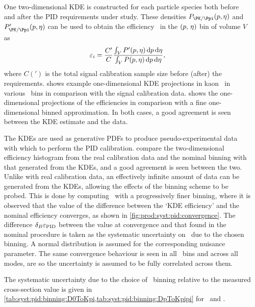 One two-dimensional \ac{KDE} is constructed for each particle species both 
before and after the \ac{PID} requirements under study.
These densities $P_{\PK/\Ppi}(\ptot, \Eta)$ and $P'_{\PK/\Ppi}(\ptot, \Eta)$
can be used to obtain the efficiency \effi\ in the $(p,\,\eta)$ bin of 
volume $V$ as
\begin{equation}
  \effi = \frac{C'}{C}\frac{%
    \int_{V} P'(\ptot,\Eta)\dif{p}\dif{\Eta}
  }{%
    \int_{V} P(\ptot,\Eta)\dif{p}\dif{\Eta}
  },
\end{equation}
where $C(')$ is the total signal calibration sample size before (after) the 
requirements.
 shows example one-dimensional \ac{KDE} 
projections in kaon \Eta\ in various \ptot\ bins in comparison with the signal 
calibration data.
 shows the one-dimensional projections 
of the efficiencies in comparison with a fine one-dimensional binned 
approximation.
In both cases, a good agreement is seen between the \ac{KDE} estimate and the 
data.

The \acp{KDE} are used as generative \acp{PDF} to produce pseudo-experimental 
data with which to perform the \ac{PID} calibration.
compare the two-dimensional efficiency histogram from the real calibration data 
and the nominal binning with that generated from the \acp{KDE}, and a good 
agreement is seen between the two.
Unlike with real calibration data, an effectively infinite amount of data can 
be generated from the \acp{KDE}, allowing the effects of the binning scheme to 
be probed.
This is done by computing \effpid\ with a progressively finer binning, where it 
is observed that the value of the difference between the `\ac{KDE} efficiency' 
and the nominal efficiency converges, as shown in 
\cref{fig:prod:syst:pid:convergence}.
The difference $\delta_{B}{\varepsilon_{\textnormal{PID}}}$ between the value at convergence and that 
found in the nominal procedure is taken as the systematic uncertainty on 
\effpid\ due to the chosen binning.
A normal distribution is assumed for the corresponding nuisance parameter.
The same convergence behaviour is seen in all \pTy\ bins and across all modes, 
are so the uncertainty is assumed to be fully correlated across them.

The systematic uncertainty due to the choice of \ptotetanspd\ binning relative 
to the measured cross-section value is given in 
\cref{tab:syst:pid:binning:D0ToKpi,tab:syst:pid:binning:DpToKpipi} for 
\DzToKpi\ and \DpToKpipi.

